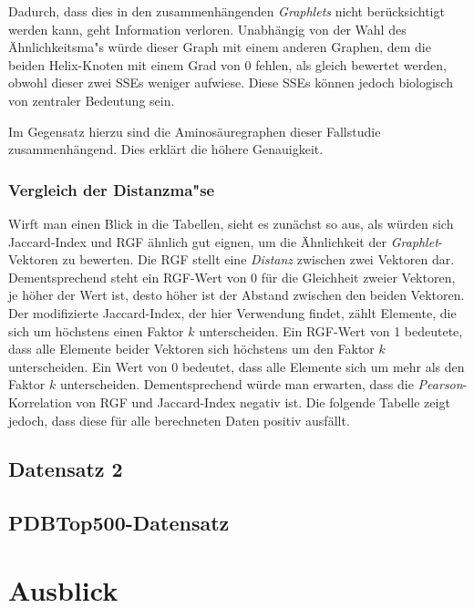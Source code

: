 \documentclass{report}
\begin{document}
Dadurch, dass dies in den zusammenh\"angenden \textit{Graphlets} nicht ber\"ucksichtigt werden kann, geht Information verloren. Unabh\"angig von der Wahl des \"Ahnlichkeitsma"s w\"urde dieser Graph mit einem anderen Graphen, dem die beiden Helix-Knoten mit einem Grad von 0 fehlen, als gleich bewertet werden, obwohl dieser zwei SSEs weniger aufwiese. Diese SSEs k\"onnen jedoch biologisch von zentraler Bedeutung sein.

Im Gegensatz hierzu sind die Aminos\"auregraphen dieser Fallstudie zusammenh\"angend. Dies erkl\"art die h\"ohere Genauigkeit.

\subsubsection{Vergleich der Distanzma"se}

Wirft man einen Blick in die Tabellen, sieht es zun\"achst so aus, als w\"urden sich Jaccard-Index und RGF \"ahnlich gut eignen, um die \"Ahnlichkeit der \textit{Graphlet}-Vektoren zu bewerten. Die RGF stellt eine \emph{Distanz} zwischen zwei Vektoren dar. Dementsprechend steht ein RGF-Wert von 0 f\"ur die Gleichheit zweier Vektoren, je h\"oher der Wert ist, desto h\"oher ist der Abstand zwischen den beiden Vektoren. Der modifizierte Jaccard-Index, der hier Verwendung findet, z\"ahlt Elemente, die sich um h\"ochstens einen Faktor $k$ unterscheiden. Ein RGF-Wert von 1 bedeutete, dass alle Elemente beider Vektoren sich h\"ochstens um den Faktor $k$ unterscheiden. Ein Wert von 0 bedeutet, dass alle Elemente sich um mehr als den Faktor $k$ unterscheiden. Dementsprechend w\"urde man erwarten, dass die \textit{Pearson}-Korrelation von RGF und Jaccard-Index negativ ist. Die folgende Tabelle zeigt jedoch, dass diese f\"ur alle berechneten Daten positiv ausf\"allt. 



\subsection{Datensatz 2}

\subsection{PDBTop500-Datensatz}





\section{Ausblick}
\end{document}
